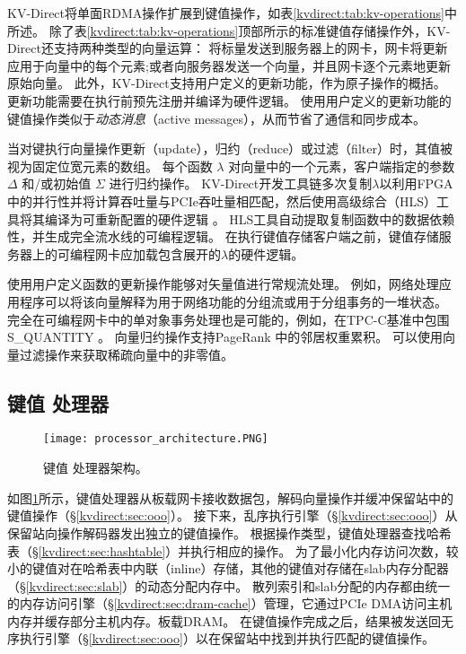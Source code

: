 KV-Direct将单面RDMA操作扩展到键值操作，如表\ref {kvdirect:tab:kv-operations}中所述。
除了表\ref {kvdirect:tab:kv-operations}顶部所示的标准键值存储操作外，KV-Direct还支持两种类型的向量运算：
将标量发送到服务器上的网卡，网卡将更新应用于向量中的每个元素;或者向服务器发送一个向量，并且网卡逐个元素地更新原始向量。
此外，KV-Direct支持用户定义的更新功能，作为原子操作的概括。
更新功能需要在执行前预先注册并编译为硬件逻辑。
使用用户定义的更新功能的键值操作类似于\textit {动态消息}（active messages）\cite {eicken1992active}，从而节省了通信和同步成本。

当对键执行向量操作更新（update），归约（reduce）或过滤（filter）时，其值被视为固定位宽元素的数组。
每个函数 $\lambda$ 对向量中的一个元素，客户端指定的参数 $\Delta$ 和/或初始值 $\Sigma$ 进行归约操作。
KV-Direct开发工具链多次复制$\lambda$以利用FPGA中的并行性并将计算吞吐量与PCIe吞吐量相匹配，然后使用高级综合（HLS）工具将其编译为可重新配置的硬件逻辑\cite {aoc} 。
HLS工具自动提取复制函数中的数据依赖性，并生成完全流水线的可编程逻辑。
在执行键值存储客户端之前，键值存储服务器上的可编程网卡应加载包含展开的$\lambda$的硬件逻辑。

使用用户定义函数的更新操作能够对矢量值进行常规流处理。
例如，网络处理应用程序可以将该向量解释为用于网络功能的分组流\cite{li2016clicknp}或用于分组事务的一堆状态\cite {sivaraman2016packet}。
完全在可编程网卡中的单对象事务处理也是可能的，例如，在TPC-C基准中包围S\_QUANTITY \cite {council2010tpc}。
向量归约操作支持PageRank \cite {page1999pagerank}中的邻居权重累积。
可以使用向量过滤操作来获取稀疏向量中的非零值。

\subsection{键值 处理器}
\label{kvdirect:sec:kv-processor}

\begin{figure}[t]
\centering
\texttt{[image: processor\_architecture.PNG]}
\caption{键值 处理器架构。}
\label{kvdirect:fig:kvprocessor-arch}

\end{figure}

如图\ref {kvdirect:fig:kvprocessor-arch}所示，键值处理器从板载网卡接收数据包，解码向量操作并缓冲保留站中的键值操作（\S \ref {kvdirect:sec:ooo}）。
接下来，乱序执行引擎（\S \ref {kvdirect:sec:ooo}）从保留站向操作解码器发出独立的键值操作。
根据操作类型，键值处理器查找哈希表（\S \ref {kvdirect:sec:hashtable}）并执行相应的操作。
为了最小化内存访问次数，较小的键值对在哈希表中内联（inline）存储，其他的键值对存储在slab内存分配器（\S \ref {kvdirect:sec:slab}）的动态分配内存中。
散列索引和slab分配的内存都由统一的内存访问引擎（\S \ref {kvdirect:sec:dram-cache}）管理，它通过PCIe DMA访问主机内存并缓存部分主机内存。板载DRAM。
在键值操作完成之后，结果被发送回无序执行引擎（\S \ref {kvdirect:sec:ooo}）以在保留站中找到并执行匹配的键值操作。

